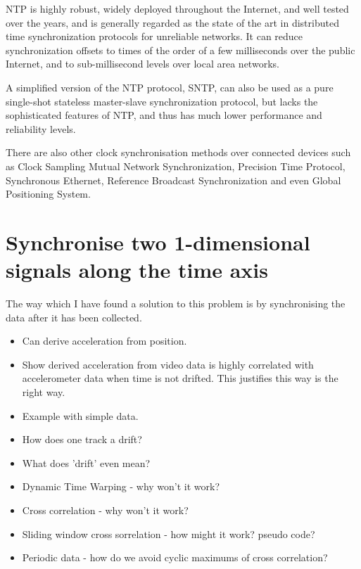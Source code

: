 NTP is highly robust, widely deployed throughout the Internet, and well tested over the years, and is generally regarded as the state of the art in distributed time synchronization protocols for unreliable networks. It can reduce synchronization
offsets to times of the order of a few milliseconds over the public Internet, and to sub-millisecond levels over local area networks.

A simplified version of the NTP protocol, SNTP, can also be used as a pure single-shot stateless master-slave synchronization protocol, but lacks the sophisticated features of NTP, and thus has much lower performance and reliability levels. \cite{wikipedia_clock_synchronisation}

There are also other clock synchronisation methods over connected devices such as Clock Sampling Mutual Network Synchronization, Precision Time Protocol, Synchronous Ethernet, Reference Broadcast Synchronization and even Global Positioning System.

\section{Synchronise two 1-dimensional signals along the time axis}
The way which I have found a solution to this problem is by synchronising the data after it has been collected. 
\begin{itemize}
    \item Can derive acceleration from position.
    \item Show derived acceleration from video data is highly correlated with accelerometer data when time is not drifted. This justifies this way is the right way.
    \item Example with simple data.
    \item How does one track a drift?
    \item What does 'drift' even mean?
    \item Dynamic Time Warping - why won't it work?
    \item Cross correlation - why won't it work?
    \item Sliding window cross sorrelation - how might it work? pseudo code?
    \item Periodic data - how do we avoid cyclic maximums of cross correlation?
\end{itemize}
